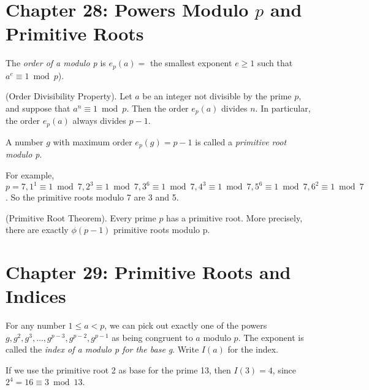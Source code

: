 \documentclass[graybox]{svmult}
\begin{document}
\section*{Chapter 28: Powers Modulo $p$ and Primitive Roots}

\begin{definition}
The \textit{order of a modulo p} is $e_p(a)=$ the smallest exponent $e \geqslant 1$ such that $a^e\equiv 1 \bmod p$).
\end{definition}

\begin{theorem}
(Order Divisibility Property). Let $a$ be an integer not divisible by the prime $p$, and suppose that $a^n \equiv 1 \bmod p$. Then the order $e_p(a)$ divides $n$.
In particular, the order $e_p(a)$ always divides $p-1$.
\end{theorem}

\begin{definition}
A number $g$ with maximum order $e_p(g) = p-1$ is called a \textit{primitive root modulo p}.
\end{definition}

For example, $p=7, 1^1 \equiv 1 \bmod 7, 2^3 \equiv 1 \bmod 7, 3^6 \equiv 1 \bmod 7, 4^3 \equiv 1 \bmod 7, 5^6\equiv 1 \bmod 7, 6^2 \equiv 1 \bmod 7$. So the primitive roots modulo 7 are 3 and 5.

\begin{svgraybox}
\begin{theorem}
(Primitive Root Theorem). Every prime $p$ has a primitive root. More precisely, there are exactly $\phi(p-1)$ primitive roots modulo p.
\end{theorem}
\end{svgraybox}

\section*{Chapter 29: Primitive Roots and Indices}

\begin{definition}
For any number $1 \leqslant a < p$, we can pick out exactly one of the powers $g, g^2, g^3, \ldots, g^{p-3}, g^{p-2}, g^{p-1}$ as being congruent to $a$ modulo $p$. The exponent is called the \textit{index of a modulo p for the base g}. Write $I(a)$ for the index.
\end{definition}

If we use the primitive root 2 as base for the prime 13, then $I(3) = 4$, since $2^4 =16\equiv 3 \bmod 13$. 
\end{document}
